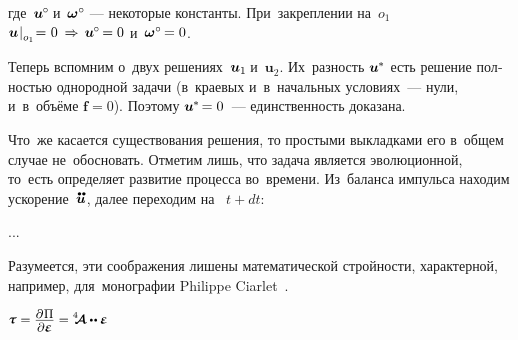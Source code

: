 \begin{otherlanguage}{russian}
\vspace{-0.25em} \noindent где~${\bm{u}^{\hspace{-0.1ex}\circ} \hspace{-0.32ex}}$ и~${\bm{\omega}^{\circ} \hspace{-0.5ex}}$~--- некоторые константы. При~закреплении на~${o_1}$ ${\bm{u} \hspace{.16ex} \rvert_{\raisemath{-0.1em}{o_1}} \hspace{-0.5ex} = \hspace{.1ex} 0 \hspace{.1ex} \,\Rightarrow\, \bm{u}^{\hspace{-0.1ex}\circ} \hspace{-0.25ex} = 0}$ и~${\bm{\omega}^{\circ} \hspace{-0.25ex} = 0}$.

Теперь вспомним о~двух решениях~${\bm{u}_1\hspace{-0.25ex}}$ и~${\bm{u}_2}$. Их~разность ${\bm{u}^{\hspace{-0.1ex}*}}$ есть решение полностью однородной задачи (в~краевых и~в~начальных условиях~--- нули, и~в~объёме ${\bm{f} = 0}$). Поэтому ${\bm{u}^{\hspace{-0.1ex}*} \hspace{-0.32ex} = 0}$~--- единственность доказана.

Что~же касается существования решения, то простыми выкладками его в~общем случае не~обосновать. Отметим лишь, что задача является эволюционной, то~есть определяет развитие процесса во~времени. Из~баланса импульса находим ускорение~$\mathdotdotabove{\bm{u}}$, далее переходим на~ ${t + dt}$:

...


Разумеется, эти соображения лишены математической стройности, характерной, например, для~монографии Philippe Ciarlet~\cite{ciarlet-mathematicalelasticity}.



\label{para:hookelaw}

\nopagebreak\vspace{-2.5em} ${\small \mathboldtau \hspace{0.1ex} = \displaystyle \frac{\raisemath{-0.2em}{\partial\hspace{0.1ex} \Pi}}{\raisemath{0.04em}{\partial \mathboldepsilon}} = \stiffnesstensor \dotdotp \mathboldepsilon}$ \nopagebreak\vspace{.55em}


\end{otherlanguage}
